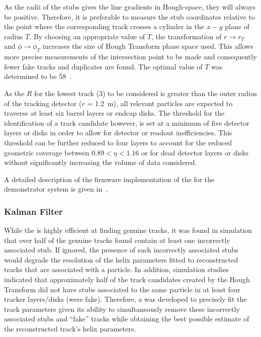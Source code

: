 As the radii of the stubs gives the line gradients in Hough-space, they will always be positive.
Therefore, it is preferable to measure the stub coordinates relative to the point where the corresponding track crosses a cylinder in the $x-y$ plane of radius $T$.
By choosing an appropriate value of $T$, the transformation of $r \rightarrow r_{T}$ and $\phi \rightarrow \phi_{T}$ increases the size of Hough Transform phase space used.
This allows more precise measurements of the intersection point to be made and consequently fewer fake tracks and duplicates are found.
The optimal value of $T$ was determined to be 58\cm~\cite{TMTT_JINST}.

As the $R$ for the lowest \pT track (3\GeV) to be considered is greater than the outer radius of the tracking detector ($r$ = 1.2~m), all relevant particles are expected to traverse at least six barrel layers or endcap disks. 
The threshold for the identification of a track candidate however, is set at a minimum of five detector layers or disks in order to allow for detector or readout inefficiencies. 
This threshold can be further reduced to four layers to account for the reduced geometric coverage between $0.89 < \eta < 1.16$ or for dead detector layers or disks without significantly increasing the volume of data considered.

A detailed description of the firmware implementation of the \HT for the demonstrator system is given in~\cite{TMTT_JINST,IEEE}.

\subsubsection{Kalman Filter}\label{subsubsec:KF}
While the \HT is highly efficient at finding genuine tracks, it was found in simulation that over half of the genuine tracks found contain at least one incorrectly associated stub.
If ignored, the presence of such incorrectly associated stubs would degrade the resolution of the helix parameters fitted to reconstructed tracks that are associated with a particle.
In addition, simulation studies indicated that approximately half of the track candidates created by the Hough Transform did not have stubs associated to the same particle in at least four tracker layers/disks (\ie were fake).
Therefore, a \KF was developed to precisely fit the track parameters given its ability to simultaneously remove these incorrectly associated stubs and ``fake'' tracks while obtaining the best possible estimate of the reconstructed track’s helix parameters.

